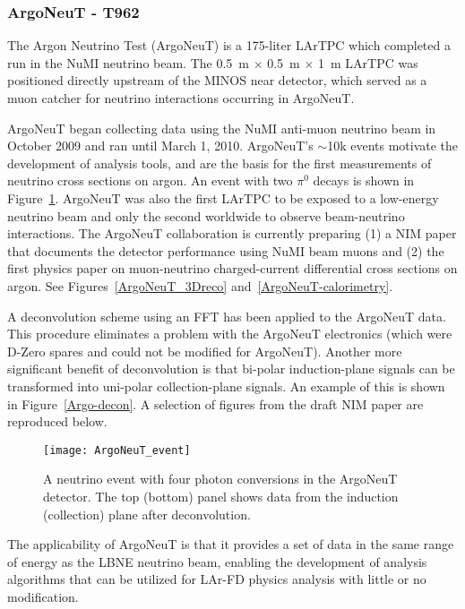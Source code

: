 \subsubsection{ArgoNeuT - T962}
The Argon Neutrino Test (ArgoNeuT) is a 175-liter LArTPC which completed a run in the NuMI neutrino beam.  The 0.5~m $\times$ 0.5~m $\times$ 1~m LArTPC was positioned directly upstream of the MINOS near detector, which served as a muon catcher for neutrino interactions occurring in ArgoNeuT. 

ArgoNeuT began collecting data using the NuMI anti-muon neutrino beam in October 2009 and ran until  March 1, 2010.  ArgoNeuT's $\sim$10k events motivate the development of analysis tools, and are the basis for the first measurements of neutrino cross sections on argon.   An event with two $\pi^{0}$ decays is shown in Figure~\ref{2pi0}.   ArgoNeuT was also the first LArTPC to be exposed to a low-energy neutrino beam and only the second worldwide to observe beam-neutrino interactions. The ArgoNeuT collaboration is currently preparing (1) a NIM paper that documents the detector performance using NuMI beam muons and (2) the first physics paper on muon-neutrino charged-current differential cross sections on argon.  See Figures~\ref{ArgoNeuT_3Dreco} and~\ref{ArgoNeuT-calorimetry}.

A deconvolution scheme using an FFT has been applied to the ArgoNeuT data. This procedure eliminates a problem with the ArgoNeuT electronics (which were D-Zero spares and could not be modified for ArgoNeuT). Another more significant benefit of deconvolution is that bi-polar induction-plane signals can be transformed into uni-polar collection-plane signals. An example of this is shown in Figure~\ref{Argo-decon}. A selection of figures from the draft NIM paper are reproduced below.


\begin{figure}
\centering 
{\texttt{[image: ArgoNeuT\_event]}}
\caption[ArgoNeuT neutrino event with four photon conversions]{A neutrino event with four photon conversions in the ArgoNeuT detector. The top (bottom) panel shows data from the induction (collection) plane after deconvolution. }
\label{2pi0}
\end{figure}


The applicability of ArgoNeuT is that it provides a set of data in the same range of energy as the LBNE neutrino beam, enabling the development of analysis algorithms that can be utilized for LAr-FD physics analysis with little or no modification.


